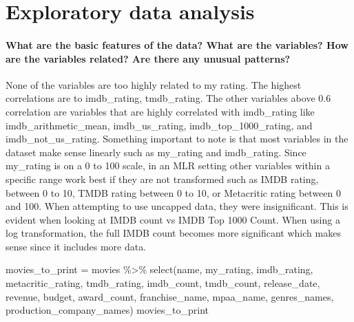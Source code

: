 \documentclass[
]{article}
\newenvironment{Shaded}{\begin{snugshade}}{\end{snugshade}}
\newcommand{\FunctionTok}[1]{\textcolor[rgb]{0.00,0.00,0.00}{#1}}
\newcommand{\NormalTok}[1]{#1}
\newcommand{\OtherTok}[1]{\textcolor[rgb]{0.56,0.35,0.01}{#1}}
\newcommand{\SpecialCharTok}[1]{\textcolor[rgb]{0.00,0.00,0.00}{#1}}
\begin{document}
\hypertarget{exploratory-data-analysis}{%
\section{Exploratory data analysis}\label{exploratory-data-analysis}}

\hypertarget{what-are-the-basic-features-of-the-data-what-are-the-variables-how-are-the-variables-related-are-there-any-unusual-patterns}{%
\paragraph{What are the basic features of the data? What are the
variables? How are the variables related? Are there any unusual
patterns?}\label{what-are-the-basic-features-of-the-data-what-are-the-variables-how-are-the-variables-related-are-there-any-unusual-patterns}}

None of the variables are too highly related to my rating. The highest
correlations are to imdb\_rating, tmdb\_rating. The other variables
above 0.6 correlation are variables that are highly correlated with
imdb\_rating like imdb\_arithmetic\_mean, imdb\_us\_rating,
imdb\_top\_1000\_rating, and imdb\_not\_us\_rating. Something important
to note is that most variables in the dataset make sense linearly such
as my\_rating and imdb\_rating. Since my\_rating is on a 0 to 100 scale,
in an MLR setting other variables within a specific range work best if
they are not transformed such as IMDB rating, between 0 to 10, TMDB
rating between 0 to 10, or Metacritic rating between 0 and 100. When
attempting to use uncapped data, they were insignificant. This is
evident when looking at IMDB count vs IMDB Top 1000 Count. When using a
log transformation, the full IMDB count becomes more significant which
makes sense since it includes more data.

\begin{Shaded}
\begin{Highlighting}[]
\NormalTok{movies\_to\_print }\OtherTok{=}\NormalTok{ movies }\SpecialCharTok{\%\textgreater{}\%} \FunctionTok{select}\NormalTok{(name, my\_rating, imdb\_rating, metacritic\_rating, tmdb\_rating, imdb\_count, tmdb\_count, release\_date, revenue, budget, award\_count, franchise\_name, mpaa\_name, genres\_names, production\_company\_names)}
\NormalTok{movies\_to\_print }
\end{Highlighting}
\end{Shaded}
\end{document}
